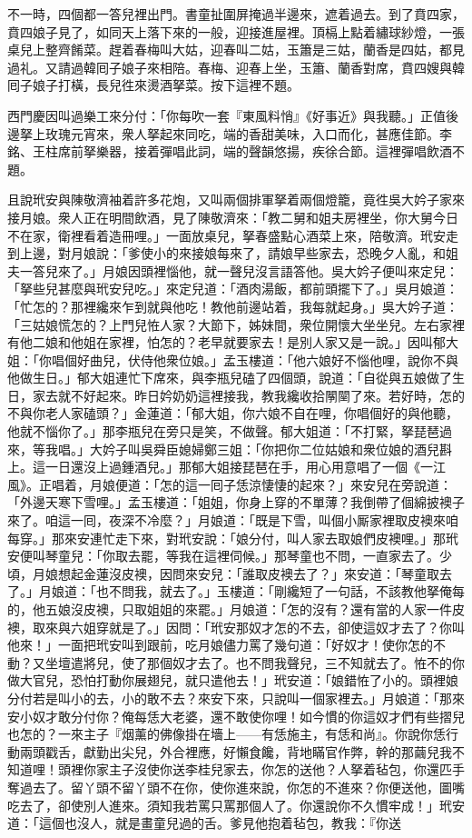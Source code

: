 不一時，四個都一答兒裡出門。書童扯圍屏掩過半邊來，遮着過去。到了賁四家，賁四娘子見了，如同天上落下來的一般，迎接進屋裡。頂槅上點着繡球紗燈，一張桌兒上整齊餚菜。趕着春梅叫大姑，迎春叫二姑，玉簫是三姑，蘭香是四姑，都見過礼。又請過韓囘子娘子來相陪。春梅、迎春上坐，玉簫、蘭香對席，賁四嫂與韓囘子娘子打橫，長兒徃來燙酒拏菜。按下這裡不題。

西門慶因叫過樂工來分付：「你每吹一套『東風料悄』《好事近》與我聽。」正值後邊拏上玫瑰元宵來，衆人拏起來同吃，端的香甜美味，入口而化，甚應佳節。李銘、王柱席前拏樂器，接着彈唱此詞，端的聲韻悠揚，疾徐合節。這裡彈唱飲酒不題。

且說玳安與陳敬濟袖着許多花炮，又叫兩個排軍拏着兩個燈籠，竟徃吳大妗子家來接月娘。衆人正在明間飲酒，見了陳敬濟來：「教二舅和姐夫房裡坐，你大舅今日不在家，衛裡看着造冊哩。」一面放桌兒，拏春盛點心酒菜上來，陪敬濟。玳安走到上邊，對月娘說：「爹使小的來接娘每來了，請娘早些家去，恐晚夕人亂，和姐夫一答兒來了。」月娘因頭裡惱他，就一聲兒沒言語答他。吳大妗子便叫來定兒：「拏些兒甚麼與玳安兒吃。」來定兒道：「酒肉湯飯，都前頭擺下了。」吳月娘道：「忙怎的？那裡纔來乍到就與他吃！教他前邊站着，我每就起身。」吳大妗子道：「三姑娘慌怎的？上門兒恠人家？大節下，姊妹間，衆位開懷大坐坐兒。左右家裡有他二娘和他姐在家裡，怕怎的？老早就要家去！是別人家又是一說。」因叫郁大姐：「你唱個好曲兒，伏侍他衆位娘。」孟玉樓道：「他六娘好不惱他哩，說你不與他做生日。」郁大姐連忙下席來，與李瓶兒磕了四個頭，說道：「自從與五娘做了生日，家去就不好起來。昨日妗奶奶這裡接我，教我纔收拾䦛䦟了來。若好時，怎的不與你老人家磕頭？」金蓮道：「郁大姐，你六娘不自在哩，你唱個好的與他聽，他就不惱你了。」那李瓶兒在旁只是笑，不做聲。{}郁大姐道：「不打緊，拏琵琶過來，等我唱。」大妗子叫吳舜臣媳婦鄭三姐：「你把你二位姑娘和衆位娘的酒兒斟上。這一日還沒上過鍾酒兒。」那郁大姐接琵琶在手，用心用意唱了一個《一江風》。正唱着，月娘便道：「怎的這一囘子恁涼悽悽的起來？」來安兒在旁說道：「外邊天寒下雪哩。」孟玉樓道：「姐姐，你身上穿的不單薄？我倒帶了個綿披襖子來了。咱這一囘，夜深不冷麼？」月娘道：「既是下雪，叫個小厮家裡取皮襖來咱每穿。」那來安連忙走下來，對玳安說：「娘分付，叫人家去取娘們皮襖哩。」那玳安便叫琴童兒：「你取去罷，等我在這裡伺候。」那琴童也不問，一直家去了。少頃，月娘想起金蓮沒皮襖，因問來安兒：「誰取皮襖去了？」來安道：「琴童取去了。」月娘道：「也不問我，就去了。」玉樓道：「剛纔短了一句話，不該教他拏俺每的，他五娘沒皮襖，只取姐姐的來罷。」月娘道：「怎的沒有？還有當的人家一件皮襖，取來與六姐穿就是了。」因問：「玳安那奴才怎的不去，卻使這奴才去了？你叫他來！」一面把玳安叫到跟前，吃月娘儘力罵了幾句道：「好奴才！使你怎的不動？又坐壇遣將兒，使了那個奴才去了。也不問我聲兒，三不知就去了。恠不的你做大官兒，恐怕打動你展翅兒，就只遣他去！」玳安道：「娘錯恠了小的。頭裡娘分付若是叫小的去，小的敢不去？來安下來，只說叫一個家裡去。」月娘道：「那來安小奴才敢分付你？俺每恁大老婆，還不敢使你哩！如今慣的你這奴才們有些摺兒也怎的？一來主子『烟薰的佛像掛在墻上——有恁施主，有恁和尚』。你說你恁行動兩頭戳舌，獻勤出尖兒，外合裡應，好懶食饞，背地瞞官作弊，幹的那繭兒我不知道哩！頭裡你家主子沒使你送李桂兒家去，你怎的送他？人拏着毡包，你還匹手奪過去了。留丫頭不留丫頭不在你，使你進來說，你怎的不進來？你便送他，圖嘴吃去了，卻使別人進來。須知我若罵只罵那個人了。你還說你不久慣牢成！」玳安道：「這個也沒人，就是畫童兒過的舌。爹見他抱着毡包，教我：『你送